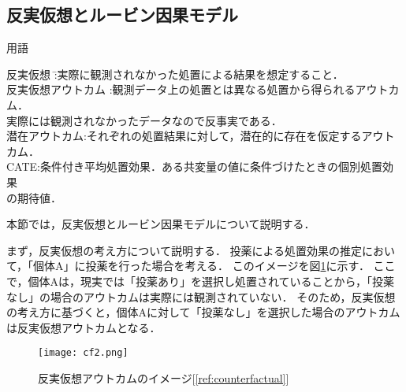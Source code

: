 \documentclass[dvipdfmx]{jreport}
\begin{document}
\subsection{反実仮想とルービン因果モデル}
\begin{itembox}[l]{\large{用語}}
    \begin{tabbing}
        \hspace{15pt} \raisebox{0.5ex}{\tiny $\bullet$} 反実仮想 \hspace{47pt}\=:実際に観測されなかった処置による結果を想定すること．\\[0.5em] 
        \hspace{15pt} \raisebox{0.5ex}{\tiny $\bullet$} 反実仮想アウトカム \>:観測データ上の処置とは異なる処置から得られるアウトカム．\\[0.5em]\>\hspace{6.5pt}実際には観測されなかったデータなので反事実である．\\[0.5em] 
        \hspace{15pt} \raisebox{0.5ex}{\tiny $\bullet$} 潜在アウトカム\>:それぞれの処置結果に対して，潜在的に存在を仮定するアウトカム．\\[0.5em]
        \hspace{15pt} \raisebox{0.5ex}{\tiny $\bullet$} CATE\>:条件付き平均処置効果．ある共変量の値に条件づけたときの個別処置効果\\[0.5em]\>\hspace{6.5pt}の期待値．
    \end{tabbing}
\end{itembox}

本節では，反実仮想とルービン因果モデルについて説明する．

まず，反実仮想の考え方について説明する．
投薬による処置効果の推定において，「個体A」に投薬を行った場合を考える．
このイメージを図\ref{fig:rubin}に示す．
ここで，個体Aは，現実では「投薬あり」を選択し処置されていることから，「投薬なし」の場合のアウトカムは実際には観測されていない．
そのため，反実仮想の考え方に基づくと，個体Aに対して「投薬なし」を選択した場合のアウトカムは反実仮想アウトカムとなる．
\begin{figure}[h]
    \begin{center}
        \texttt{[image: cf2.png]} 
        \caption{反実仮想アウトカムのイメージ[\ref{ref:counterfactual}]} \label{fig:rubin}
    \end{center}
\end{figure}
\end{document}
